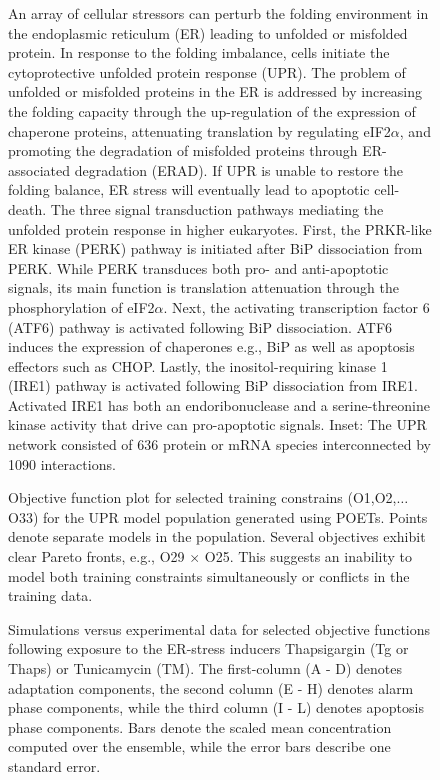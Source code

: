 \documentclass[fleqn,10pt]{wlscirep}
\begin{document}
\begin{figure}\centering
{}
	\caption{An array of cellular stressors can perturb the folding environment in the endoplasmic reticulum (ER) leading to unfolded or misfolded protein. In response to the folding imbalance, cells initiate the cytoprotective unfolded protein response (UPR). The problem of unfolded or misfolded proteins in the ER is addressed by increasing the folding capacity through the up-regulation of the expression of chaperone proteins, attenuating translation by regulating eIF2$\alpha$, and promoting the degradation of misfolded proteins through ER-associated degradation (ERAD). If UPR is unable to restore the folding balance, ER stress will eventually lead to apoptotic cell-death. The three signal transduction pathways mediating the unfolded protein response in higher eukaryotes. First, the PRKR-like ER kinase (PERK) pathway is initiated after BiP dissociation from PERK. While PERK transduces both pro- and anti-apoptotic signals, its main function is translation attenuation through the phosphorylation of eIF2$\alpha$. Next, the activating transcription factor 6 (ATF6) pathway is activated following BiP dissociation. ATF6 induces the expression of chaperones e.g., BiP as well as apoptosis effectors such as CHOP. Lastly, the inositol-requiring kinase 1 (IRE1) pathway is activated following BiP dissociation from IRE1. Activated IRE1 has both an endoribonuclease and a serine-threonine kinase activity that drive can pro-apoptotic signals. Inset: The UPR network consisted of 636 protein or mRNA species interconnected by 1090 interactions.}
	\label{fg:fig1}
\end{figure}

\begin{figure}\centering
{}
	\caption{Objective function plot for selected training constrains (O1,O2,$\hdots$O33) for the UPR model population generated using POETs. Points denote separate models in the population. Several objectives exhibit clear Pareto fronts, e.g., O29 $\times$ O25. This suggests an inability to model both training constraints simultaneously or conflicts in the training data.}
	\label{fg:objective_plot}
\end{figure}

\begin{figure}\centering
{}
	\caption{Simulations versus experimental data for selected objective functions following exposure to the ER-stress inducers Thapsigargin (Tg or Thaps) or Tunicamycin (TM). The first-column (A - D) denotes adaptation components, the second column (E - H) denotes alarm phase components, while the third column (I - L) denotes apoptosis phase components. Bars denote the scaled mean concentration computed over the ensemble, while the error bars describe one standard error.}
	\label{fg:simulation_comparison}
\end{figure}
\end{document}
